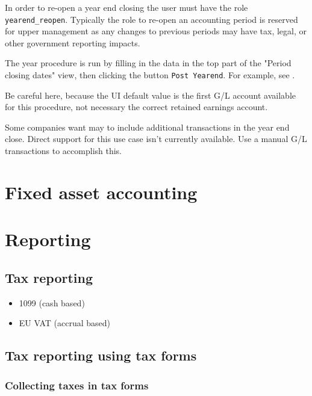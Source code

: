 In order to re-open a year end closing the user must have the role \texttt{yearend\_reopen}.
Typically the role to re-open an accounting period is reserved for upper management as any changes to previous periods may have tax, legal, or other government reporting impacts.

The year procedure is run by filling in the data in the top part of the "Period closing dates" view, then clicking the button \texttt{Post Yearend}. For example, see .

Be careful here, because the UI default value is the first G/L account available for this procedure, 
not necessary the correct retained earnings account.

Some companies want may to include additional transactions in the year end close.
Direct support for this use case isn't currently available.
Use a manual G/L transactions to accomplish this.


\section{Fixed asset accounting}
\label{sec-business-processes-accounting-fixed-asset-accounting}



\section{Reporting}
\label{sec-business-processes-accounting-reporting}

\subsection{Tax reporting}
\label{subsec-business-processes-accounting-reporting-tax}


\begin{itemize}
\item 1099 (cash based)
\item EU \gls{VAT} (accrual based)
\end{itemize}


\subsection{Tax reporting using tax forms}
\label{subsec-business-processes-accounting-reporting-tax-with-taxforms}

\subsubsection{Collecting taxes in tax forms}
\label{subsubsec-business-processes-accounting-reporting-tax-collecting-taxforms}

